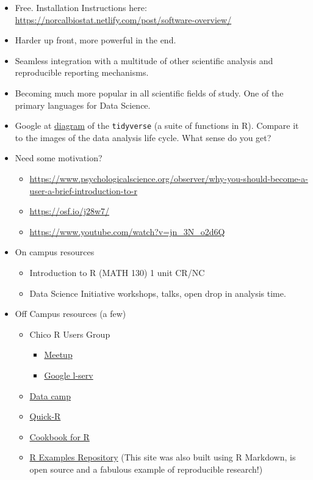 \documentclass[]{article}
\providecommand{\tightlist}{%
  \setlength{\itemsep}{0pt}\setlength{\parskip}{0pt}}
\begin{document}
\begin{itemize}
\tightlist
\item
  Free. Installation Instructions here:
  \url{https://norcalbiostat.netlify.com/post/software-overview/}
\item
  Harder up front, more powerful in the end.
\item
  Seamless integration with a multitude of other scientific analysis and
  reproducible reporting mechanisms.
\item
  Becoming much more popular in all scientific fields of study. One of
  the primary languages for Data Science.
\item
  Google at \href{https://osf.io/69gub/wiki/home/}{diagram} of the
  \texttt{tidyverse} (a suite of functions in R). Compare it to the
  images of the data analysis life cycle. What sense do you get?
\item
  Need some motivation?

  \begin{itemize}
  \tightlist
  \item
    \url{https://www.psychologicalscience.org/observer/why-you-should-become-a-user-a-brief-introduction-to-r}
  \item
    \url{https://osf.io/j28w7/}
  \item
    \url{https://www.youtube.com/watch?v=jn_3N_o2d6Q}
  \end{itemize}
\item
  On campus resources

  \begin{itemize}
  \tightlist
  \item
    Introduction to R (MATH 130) 1 unit CR/NC
  \item
    Data Science Initiative workshops, talks, open drop in analysis
    time.
  \end{itemize}
\item
  Off Campus resources (a few)

  \begin{itemize}
  \tightlist
  \item
    Chico R Users Group

    \begin{itemize}
    \tightlist
    \item
      \href{https://www.meetup.com/Chico-R-Users-Group/}{Meetup}
    \item
      \href{https://groups.google.com/forum/\#!forum/chico-rug}{Google
      l-serv}
    \end{itemize}
  \item
    \href{http://www.datacamp.com}{Data camp}
  \item
    \href{http://www.statmethods.net/}{Quick-R}
  \item
    \href{http://www.cookbook-r.com/}{Cookbook for R}
  \item
    \href{http://dwoll.de/rexrepos/}{R Examples Repository} (This site
    was also built using R Markdown, is open source and a fabulous
    example of reproducible research!)
  \end{itemize}
\end{itemize}
\end{document}
